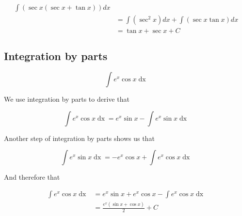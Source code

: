 \documentclass[a4paper, titlepage]{article}
\begin{document}
\begin{Answer}
\begin{align*}
    \int \left( \sec x \left( \sec x + \tan x \right) \right) dx \\
    &= \int \left( \sec^2 x \right) dx + \int \left( \sec x \tan x \right) dx \\
    &= \tan x + \sec x + C
\end{align*}
\end{Answer}

\subsection{Integration by parts}

\begin{Exercise}
\[\int e^x \cos x \mathop{dx}\]
\end{Exercise}

\begin{Answer}

We use integration by parts to derive that

\[\int e^x \cos x \mathop{dx}
  = e^x \sin x - \int e^x \sin x \mathop{dx}\]

Another step of integration by parts shows us that 

    \[\int e^x \sin x \mathop{dx} = - e^x \cos x + \int e^x \cos x \mathop{dx}\]

And therefore that

\begin{align*}
\int e^x \cos x \mathop{dx} &= e^x \sin x + e^x \cos x - \int e^x \cos x \mathop{dx} \\
 &= \frac{e^x \left(\sin x + \cos x \right)}{2} + C
\end{align*}
\end{Answer}

\printbibliography
\end{document}
